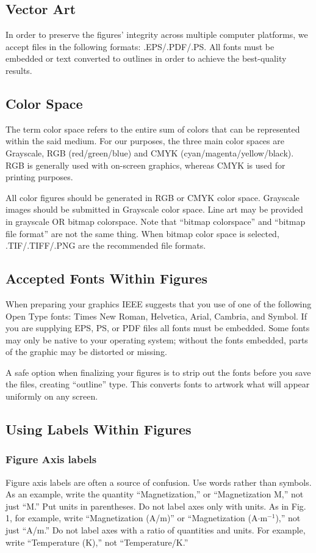 \documentclass[journal,onecolumn,web]{ieeecolor}
\begin{document}
\subsection{Vector Art}
In order to preserve the figures' integrity across multiple computer 
platforms, we accept files in the following formats: .EPS/.PDF/.PS. All 
fonts must be embedded or text converted to outlines in order to achieve the 
best-quality results.

\subsection{Color Space}
The term color space refers to the entire sum of colors that can be 
represented within the said medium. For our purposes, the three main color 
spaces are Grayscale, RGB (red/green/blue) and CMYK 
(cyan/magenta/yellow/black). RGB is generally used with on-screen graphics, 
whereas CMYK is used for printing purposes.

All color figures should be generated in RGB or CMYK color space. Grayscale 
images should be submitted in Grayscale color space. Line art may be 
provided in grayscale OR bitmap colorspace. Note that ``bitmap colorspace'' 
and ``bitmap file format'' are not the same thing. When bitmap color space 
is selected, .TIF/.TIFF/.PNG are the recommended file formats.

\subsection{Accepted Fonts Within Figures}
When preparing your graphics IEEE suggests that you use of one of the 
following Open Type fonts: Times New Roman, Helvetica, Arial, Cambria, and 
Symbol. If you are supplying EPS, PS, or PDF files all fonts must be 
embedded. Some fonts may only be native to your operating system; without 
the fonts embedded, parts of the graphic may be distorted or missing.

A safe option when finalizing your figures is to strip out the fonts before 
you save the files, creating ``outline'' type. This converts fonts to 
artwork what will appear uniformly on any screen.

\subsection{Using Labels Within Figures}

\subsubsection{Figure Axis labels }
Figure axis labels are often a source of confusion. Use words rather than 
symbols. As an example, write the quantity ``Magnetization,'' or 
``Magnetization M,'' not just ``M.'' Put units in parentheses. Do not label 
axes only with units. As in Fig. 1, for example, write ``Magnetization 
(A/m)'' or ``Magnetization (A$\cdot$m$^{-1}$),'' not just ``A/m.'' Do not label axes with a ratio of quantities and 
units. For example, write ``Temperature (K),'' not ``Temperature/K.'' 
\end{document}
